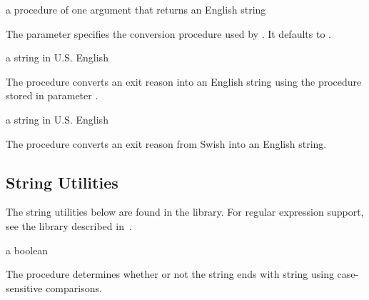 \begin{parameter}
\end{parameter}
\hasvalue{} a procedure of one argument that returns an English string

The  parameter specifies the
conversion procedure used by . It defaults
to .

\begin{procedure}
\end{procedure}
\returns{} a string in U.S. English

The  procedure converts an exit reason into
an English string using the procedure stored in parameter
.

\begin{procedure}
\end{procedure}
\returns{} a string in U.S. English

The  procedure converts an exit
reason from Swish into an English string.

\subsection{String Utilities}

The string utilities below are found in the  library. For regular expression support, see the
 library described in~\cite{pregexp}.

\begin{procedure}
\end{procedure}
\returns{} a boolean

The  procedure determines whether or not the string
 ends with string  using case-sensitive comparisons.

